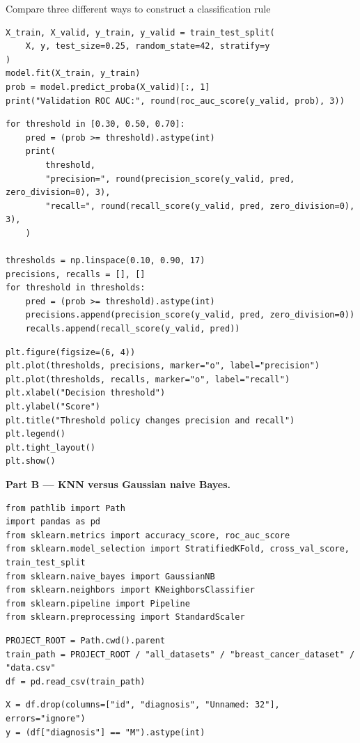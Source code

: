 \begin{labproject}{Compare three different ways to construct a classification rule}
\begin{lstlisting}[style=mlpython]
X_train, X_valid, y_train, y_valid = train_test_split(
    X, y, test_size=0.25, random_state=42, stratify=y
)
model.fit(X_train, y_train)
prob = model.predict_proba(X_valid)[:, 1]
print("Validation ROC AUC:", round(roc_auc_score(y_valid, prob), 3))
\end{lstlisting}

\begin{lstlisting}[style=mlpython]
for threshold in [0.30, 0.50, 0.70]:
    pred = (prob >= threshold).astype(int)
    print(
        threshold,
        "precision=", round(precision_score(y_valid, pred, zero_division=0), 3),
        "recall=", round(recall_score(y_valid, pred, zero_division=0), 3),
    )

thresholds = np.linspace(0.10, 0.90, 17)
precisions, recalls = [], []
for threshold in thresholds:
    pred = (prob >= threshold).astype(int)
    precisions.append(precision_score(y_valid, pred, zero_division=0))
    recalls.append(recall_score(y_valid, pred))
\end{lstlisting}

\begin{lstlisting}[style=mlpython]
plt.figure(figsize=(6, 4))
plt.plot(thresholds, precisions, marker="o", label="precision")
plt.plot(thresholds, recalls, marker="o", label="recall")
plt.xlabel("Decision threshold")
plt.ylabel("Score")
plt.title("Threshold policy changes precision and recall")
plt.legend()
plt.tight_layout()
plt.show()
\end{lstlisting}

\medskip\noindent\textbf{Part B --- KNN versus Gaussian naive Bayes.}\par
\begin{lstlisting}[style=mlpython]
from pathlib import Path
import pandas as pd
from sklearn.metrics import accuracy_score, roc_auc_score
from sklearn.model_selection import StratifiedKFold, cross_val_score, train_test_split
from sklearn.naive_bayes import GaussianNB
from sklearn.neighbors import KNeighborsClassifier
from sklearn.pipeline import Pipeline
from sklearn.preprocessing import StandardScaler
\end{lstlisting}

\begin{lstlisting}[style=mlpython]
PROJECT_ROOT = Path.cwd().parent
train_path = PROJECT_ROOT / "all_datasets" / "breast_cancer_dataset" / "data.csv"
df = pd.read_csv(train_path)
\end{lstlisting}

\begin{lstlisting}[style=mlpython]
X = df.drop(columns=["id", "diagnosis", "Unnamed: 32"], errors="ignore")
y = (df["diagnosis"] == "M").astype(int)


\end{lstlisting}
\end{labproject}
